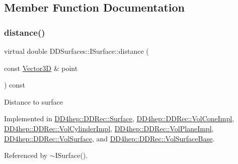 \subsection{Member Function Documentation}
\hypertarget{class_d_d_surfaces_1_1_i_surface_a430ebd157354388b50218dfb356a9ca1}{}\label{class_d_d_surfaces_1_1_i_surface_a430ebd157354388b50218dfb356a9ca1} 
\subsubsection{\texorpdfstring{distance()}{distance()}}
{\footnotesize\ttfamily virtual double D\+D\+Surfaces\+::\+I\+Surface\+::distance (\begin{DoxyParamCaption}\item[{const \hyperlink{class_d_d_surfaces_1_1_vector3_d}{Vector3D} \&}]{point }\end{DoxyParamCaption}) const\hspace{0.3cm}{\ttfamily [pure virtual]}}

Distance to surface 

Implemented in \hyperlink{class_d_d4hep_1_1_d_d_rec_1_1_surface_ae673205d84823da5118cc1ae4a3403fb}{D\+D4hep\+::\+D\+D\+Rec\+::\+Surface}, \hyperlink{class_d_d4hep_1_1_d_d_rec_1_1_vol_cone_impl_af24505f927a05c9d8225609135257f1c}{D\+D4hep\+::\+D\+D\+Rec\+::\+Vol\+Cone\+Impl}, \hyperlink{class_d_d4hep_1_1_d_d_rec_1_1_vol_cylinder_impl_a34013e2fc45f1312dea83210f9c30751}{D\+D4hep\+::\+D\+D\+Rec\+::\+Vol\+Cylinder\+Impl}, \hyperlink{class_d_d4hep_1_1_d_d_rec_1_1_vol_plane_impl_a5c94e22dfc7011f6ebcf40bae215bf31}{D\+D4hep\+::\+D\+D\+Rec\+::\+Vol\+Plane\+Impl}, \hyperlink{class_d_d4hep_1_1_d_d_rec_1_1_vol_surface_aa619b563fdbb84fe93d7b983d2ab277c}{D\+D4hep\+::\+D\+D\+Rec\+::\+Vol\+Surface}, and \hyperlink{class_d_d4hep_1_1_d_d_rec_1_1_vol_surface_base_aefb278e0429219871c47b602a2593fef}{D\+D4hep\+::\+D\+D\+Rec\+::\+Vol\+Surface\+Base}.



Referenced by $\sim$\+I\+Surface().

\hypertarget{class_d_d_surfaces_1_1_i_surface_a0d6db86d4871584a9e72ac6018229737}{}\label{class_d_d_surfaces_1_1_i_surface_a0d6db86d4871584a9e72ac6018229737} 
